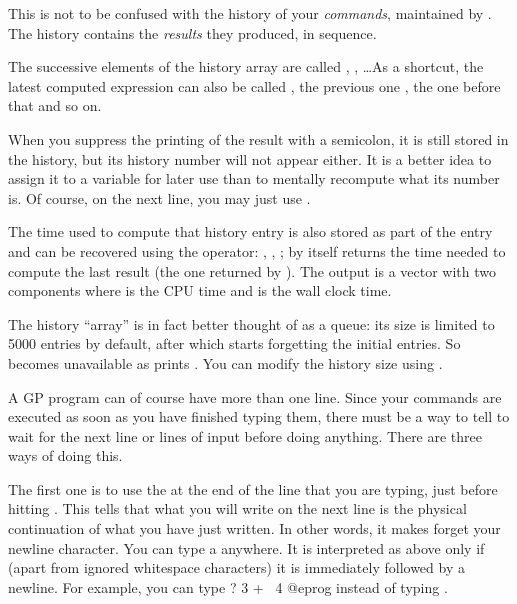 
This is not to be confused with the history of your \emph{commands},
maintained by . The  history contains the \emph{results}
they produced, in sequence.

The successive elements of the history array are called , ,
\dots As a shortcut, the latest computed expression can also be
called \kbd{\%}, the previous one ,
the one before that  and so on.

When you suppress the printing of the result with a semicolon, it is still
stored in the history, but its history number will not appear either. It is a
better idea to assign it to a variable for later use than to mentally
recompute what its number is. Of course, on the next line, you may just use
\kbd{\%}.

The time used to compute that history entry is also stored as part of the entry
and can be recovered using the \kbd{\%\#} operator: , ,
; \kbd{\%\#} by itself returns the time needed to compute the last
result (the one returned by \kbd{\%}). The output is a vector with two
components  where  is the CPU time and  is
the wall clock time.

The history ``array'' is in fact better thought of as a queue: its size is
limited to 5000 entries by default, after which  starts forgetting
the initial entries. So  becomes unavailable as  prints
. You can modify the history size using .

 A GP program
can of course have more than one line. Since your commands are executed as
soon as you have finished typing them, there must be a way to tell 
to wait for the next line or lines of input before doing anything. There are
three ways of doing this.

The first one is to use the  \kbd{\bs} at the end of
the line that you are typing, just before hitting . This tells
 that what you will write on the next line is the physical
continuation of what you have just written. In other words, it makes 
forget your newline character. You can type a \kbd{\bs} anywhere. It is
interpreted as above only if (apart from ignored whitespace characters) it is
immediately followed by a newline. For example, you can type
\bprog
? 3 + \
4
@eprog
\noindent instead of typing .

